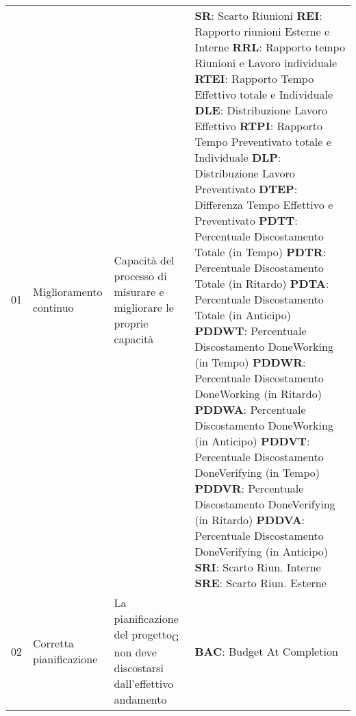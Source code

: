 \begin{longtable}{ 
		>{}p{} 
		>{}p{}
        >{}p{}
        >{\centering}p{} }
        01 & Miglioramento continuo & Capacità del processo di misurare e migliorare le proprie capacità & \textbf{SR}: Scarto Riunioni \newline
                         \textbf{REI}: Rapporto riunioni Esterne e Interne \newline
                         \textbf{RRL}: Rapporto tempo Riunioni e Lavoro individuale \newline
                         \textbf{RTEI}: Rapporto Tempo Effettivo totale e Individuale \newline
                         \textbf{DLE}: Distribuzione Lavoro Effettivo \newline
                         \textbf{RTPI}: Rapporto Tempo Preventivato totale e Individuale \newline
                         \textbf{DLP}: Distribuzione Lavoro Preventivato \newline 
                         \textbf{DTEP}: Differenza Tempo Effettivo e Preventivato \newline 
                         \textbf{PDTT}: Percentuale Discostamento Totale (in Tempo) \newline 
                         \textbf{PDTR}: Percentuale Discostamento Totale (in Ritardo) \newline 
                         \textbf{PDTA}: Percentuale Discostamento Totale (in Anticipo) \newline 
                         \textbf{PDDWT}: Percentuale Discostamento DoneWorking (in Tempo) \newline 
                         \textbf{PDDWR}: Percentuale Discostamento DoneWorking (in Ritardo) \newline 
                         \textbf{PDDWA}: Percentuale Discostamento DoneWorking (in Anticipo) \newline 
                         \textbf{PDDVT}: Percentuale Discostamento DoneVerifying (in Tempo) \newline
                         \textbf{PDDVR}: Percentuale Discostamento DoneVerifying (in Ritardo) \newline
                         \textbf{PDDVA}: Percentuale Discostamento DoneVerifying (in Anticipo) \newline
                         \textbf{SRI}: Scarto Riun. Interne \newline 
                         \textbf{SRE}: Scarto Riun. Esterne 
                         \tabularnewline
        02 & Corretta pianificazione & La pianificazione del progetto\textsubscript{G} non deve discostarsi dall'effettivo andamento &\textbf{ BAC}: Budget At Completion \newline 

\end{longtable}

